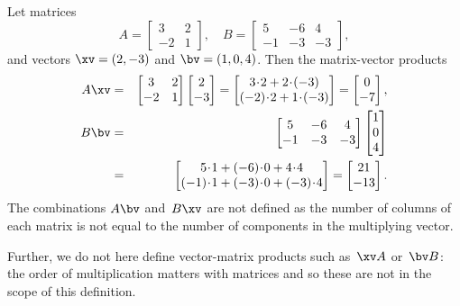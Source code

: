 \begin{example} \label{eg:matvecmul}
Let matrices
\begin{equation*}
A=\begin{bmatrix} 3 & 2\\ -2 & 1 \end{bmatrix},\quad
B=\begin{bmatrix} 5 & -6 & 4\\ -1 & -3 & -3 \end{bmatrix},
\end{equation*}
and vectors \(\xv=(2,-3)\) and \(\bv=(1,0,4)\).
Then the matrix-vector products
\begin{eqnarray*}
A\xv&=&\begin{bmatrix} 3 & 2\\ -2 & 1 \end{bmatrix}
\begin{bmatrix} 2\\-3 \end{bmatrix}
=\begin{bmatrix} 3\cdot2+2\cdot(-3)\\ (-2)\cdot2+1\cdot(-3) \end{bmatrix}
=\begin{bmatrix} 0\\ -7 \end{bmatrix},
\\
B\bv&=&\begin{bmatrix} 5 & -6 & 4\\ -1 & -3 & -3 \end{bmatrix}
\begin{bmatrix} 1\\0\\4 \end{bmatrix}
\\&=&\begin{bmatrix} 5\cdot1+(-6)\cdot0 + 4\cdot4\\ (-1)\cdot1 + (-3)\cdot0 + (-3)\cdot4 \end{bmatrix}
=\begin{bmatrix} 21\\-13 \end{bmatrix}.
\end{eqnarray*}
The combinations \(A\bv\) and~\(B\xv\) are not defined as the number of columns of each matrix is not equal to the number of components in the multiplying vector.

Further, we do not here define vector-matrix products such as~\(\xv A\) or~\(\bv B\): the order of multiplication matters with matrices and so these are not in the scope of this definition.
\end{example}



